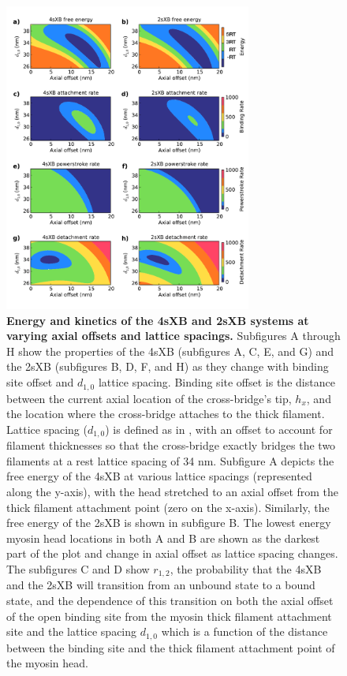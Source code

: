 \documentclass[]{article}
\begin{document}
\begin{figure}[htbp]
    \begin{center}
    \includegraphics[width=3.2in]{../imgs/Figure2.pdf}
    \caption{
        \label{fig_kinetics_contours}
        \textbf{Energy and kinetics of the 4sXB and 2sXB systems at varying axial offsets and lattice spacings.} 
        Subfigures A through H show the properties of the 4sXB (subfigures A, C, E, and G) and the 2sXB (subfigures B, D, F, and H) as they change with binding site offset and $d_{1,0}$ lattice spacing.
        Binding site offset is the distance between the current axial location of the cross-bridge's tip, $h_x$, and the location where the cross-bridge attaches to the thick filament.
        Lattice spacing ($d_{1,0}$) is defined as in \citet{Millman1998}, with an offset to account for filament thicknesses so that the cross-bridge exactly bridges the two filaments at a rest lattice spacing of 34 nm.
        Subfigure A depicts the free energy of the 4sXB at various lattice spacings (represented along the y-axis), with the head stretched to an axial offset from the thick filament attachment point (zero on the x-axis).
        Similarly, the free energy of the 2sXB is shown in subfigure B.
        The lowest energy myosin head locations in both A and B are shown as the darkest part of the plot and change in axial offset as lattice spacing changes.
        The subfigures C and D show $r_{1,2}$, the probability that the 4sXB and the 2sXB will transition from an unbound state to a bound state, and the dependence of this transition on both the axial offset of the open binding site from the myosin thick filament attachment site and the lattice spacing $d_{1,0}$ which is a function of the distance between the binding site and the thick filament attachment point of the myosin head. 
}
\end{center}
\end{figure}
\end{document}
